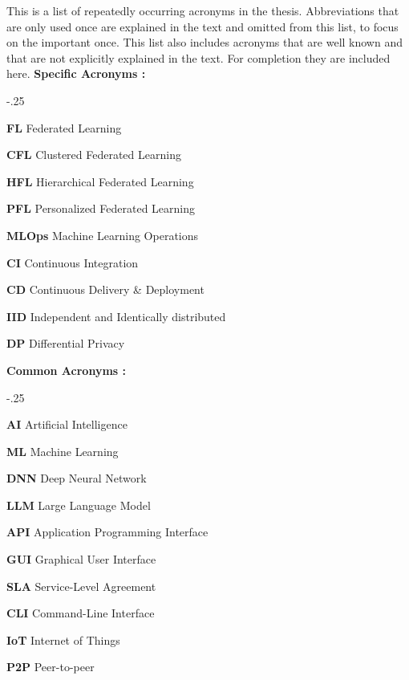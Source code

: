 This is a list of repeatedly occurring acronyms in the thesis.
Abbreviations that are only used once are explained in the text and omitted from this list,
to focus on the important once.
This list also includes acronyms that are well known and that are not explicitly explained in the text.
For completion they are included here.
\vspace{5mm}
\newline
\textbf{Specific Acronyms :}
\begin{acronym}
    \itemsep-.25\baselineskip
    \item[\textbf{FL}] Federated Learning 
    \item[\textbf{CFL}] Clustered Federated Learning 
    \item[\textbf{HFL}] Hierarchical Federated Learning 
    \item[\textbf{PFL}] Personalized Federated Learning 
    \item[\textbf{MLOps}] Machine Learning Operations
    \item[\textbf{CI}] Continuous Integration
    \item[\textbf{CD}] Continuous Delivery \& Deployment
    \item[\textbf{IID}] Independent and Identically distributed
    \item[\textbf{DP}] Differential Privacy 
\end{acronym}
\textbf{Common Acronyms :}
\begin{acronym}
    \itemsep-.25\baselineskip
    \item[\textbf{AI}] Artificial Intelligence
    \item[\textbf{ML}] Machine Learning
    \item[\textbf{DNN}] Deep Neural Network
    \item[\textbf{LLM}] Large Language Model
    \item[\textbf{API}] Application Programming Interface
    \item[\textbf{GUI}] Graphical User Interface
    \item[\textbf{SLA}] Service-Level Agreement
    \item[\textbf{CLI}] Command-Line Interface
    \item[\textbf{IoT}] Internet of Things
    \item[\textbf{P2P}] Peer-to-peer
\end{acronym}